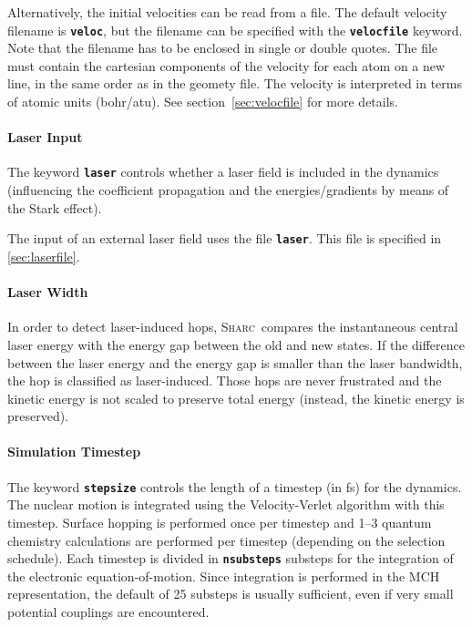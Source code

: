 \documentclass[a4paper,11pt,DIV=15,openany,twoside=false]{scrbook}
\newcommand{\sharc}{\textsc{Sharc}}
\newcommand{\ttt}[1]{\textbf{\texttt{#1}}}
\begin{document}
Alternatively, the initial velocities can be read from a file. 
The default velocity filename is \ttt{veloc}, but the filename can be specified with the \ttt{velocfile} keyword. Note that the filename has to be enclosed in single or double quotes. The file must contain the cartesian components of the velocity for each atom on a new line, in the same order as in the geomety file. The velocity is interpreted in terms of atomic units (bohr/atu). See section~\ref{sec:velocfile} for more details.

\paragraph{Laser Input}

The keyword \ttt{laser} controls whether a laser field is included in the dynamics (influencing the coefficient propagation and the energies/gradients by means of the Stark effect). 

The input of an external laser field uses the file \ttt{laser}. This file is specified in \ref{sec:laserfile}.

\paragraph{Laser Width}

In order to detect laser-induced hops, \sharc\ compares the instantaneous central laser energy with the energy gap between the old and new states. If the difference between the laser energy and the energy gap is smaller than the laser bandwidth, the hop is classified as laser-induced. Those hops are never frustrated and the kinetic energy is not scaled to preserve total energy (instead, the kinetic energy is preserved).

\paragraph{Simulation Timestep}

The keyword \ttt{stepsize} controls the length of a timestep (in fs) for the dynamics. The nuclear motion is integrated using the Velocity-Verlet algorithm with this timestep. Surface hopping is performed once per timestep and 1--3 quantum chemistry calculations are performed per timestep (depending on the selection schedule). Each timestep is divided in \ttt{nsubsteps} substeps for the integration of the electronic equation-of-motion. Since integration is performed in the MCH representation, the default of 25 substeps is usually sufficient, even if very small potential couplings are encountered.
\end{document}
